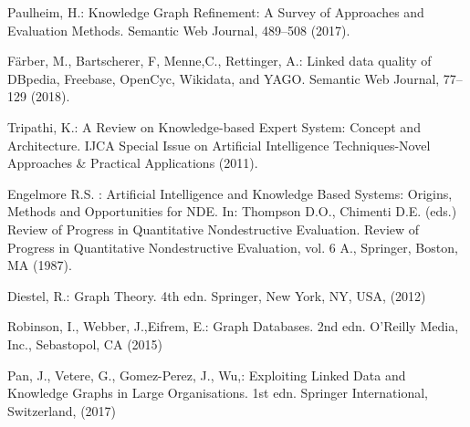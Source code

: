 \documentclass[runningheads]{llncs}
\begin{document}
\begin{thebibliography}{8}
Paulheim, H.: Knowledge Graph Refinement: A Survey of Approaches and Evaluation Methods. Semantic Web Journal, 489--508 (2017). 

F{\"a}rber, M., Bartscherer, F, Menne,C., Rettinger, A.: Linked data quality of DBpedia, Freebase, OpenCyc, Wikidata, and YAGO. Semantic Web Journal, 77--129 (2018). 

Tripathi, K.: A Review on Knowledge-based Expert System: Concept and Architecture. IJCA Special Issue on Artificial Intelligence Techniques-Novel Approaches \& Practical Applications (2011). 

Engelmore R.S.  : Artificial Intelligence and Knowledge Based Systems: Origins, Methods and Opportunities for NDE. In: Thompson D.O., Chimenti D.E. (eds.) Review of Progress in Quantitative Nondestructive Evaluation. Review of Progress in Quantitative Nondestructive Evaluation, vol. 6 A., 
Springer, Boston, MA (1987). 

Diestel, R.: Graph Theory. 4th edn. Springer, New York, NY, USA, (2012)

Robinson, I., Webber, J.,Eifrem, E.: Graph Databases. 2nd edn. O'Reilly Media, Inc., Sebastopol, CA (2015)

Pan, J., Vetere, G., Gomez-Perez, J., Wu,: Exploiting Linked Data and Knowledge Graphs in Large Organisations. 1st edn. Springer International, Switzerland, (2017)

\end{thebibliography}

\end{document}
